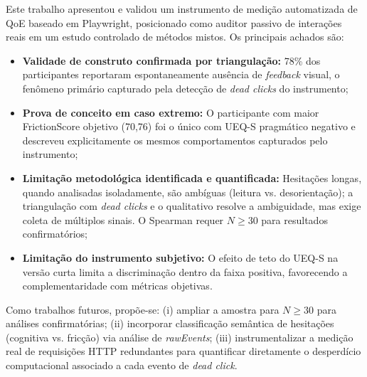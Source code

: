 \documentclass[12pt]{article}
\begin{document}
Este trabalho apresentou e validou um instrumento de medição automatizada de QoE baseado em Playwright, posicionado como auditor passivo de interações reais em um estudo controlado de métodos mistos. Os principais achados são:

\begin{itemize}
    \item \textbf{Validade de construto confirmada por triangulação:} 78\% dos participantes reportaram espontaneamente ausência de \textit{feedback} visual, o fenômeno primário capturado pela detecção de \textit{dead clicks} do instrumento;
    \item \textbf{Prova de conceito em caso extremo:} O participante com maior FrictionScore objetivo (70,76) foi o único com UEQ-S pragmático negativo e descreveu explicitamente os mesmos comportamentos capturados pelo instrumento;
    \item \textbf{Limitação metodológica identificada e quantificada:} Hesitações longas, quando analisadas isoladamente, são ambíguas (leitura vs. desorientação); a triangulação com \textit{dead clicks} e o qualitativo resolve a ambiguidade, mas exige coleta de múltiplos sinais. O Spearman requer $N \geq 30$ para resultados confirmatórios;
    \item \textbf{Limitação do instrumento subjetivo:} O efeito de teto do UEQ-S na versão curta limita a discriminação dentro da faixa positiva, favorecendo a complementaridade com métricas objetivas.
\end{itemize}

Como trabalhos futuros, propõe-se: (i) ampliar a amostra para $N \geq 30$ para análises confirmatórias; (ii) incorporar classificação semântica de hesitações (cognitiva vs. fricção) via análise de \textit{rawEvents}; (iii) instrumentalizar a medição real de requisições HTTP redundantes para quantificar diretamente o desperdício computacional associado a cada evento de \textit{dead click}.


\end{document}
